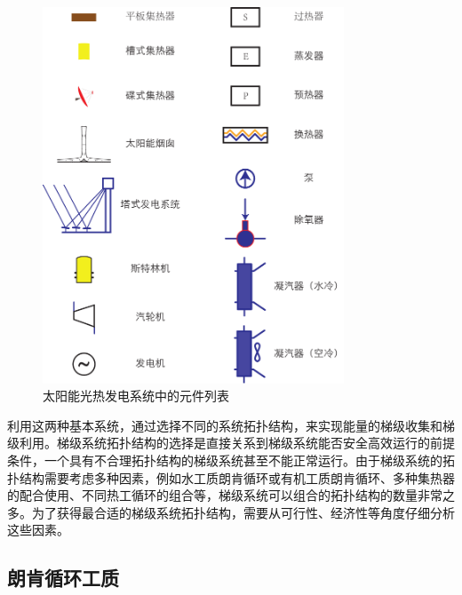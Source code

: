\begin{figure}[!ht]
\centering
\includegraphics[width=0.8\textwidth]{fig/Legends.pdf}
\caption{太阳能光热发电系统中的元件列表}
\label{fig:Legends}
\end{figure}

利用这两种基本系统，通过选择不同的系统拓扑结构，来实现能量的梯级收集和梯级利用。梯级系统拓扑结构的选择是直接关系到梯级系统能否安全高效运行的前提条件，一个具有不合理拓扑结构的梯级系统甚至不能正常运行。由于梯级系统的拓扑结构需要考虑多种因素，例如水工质朗肯循环或有机工质朗肯循环、多种集热器的配合使用、不同热工循环的组合等，梯级系统可以组合的拓扑结构的数量非常之多。为了获得最合适的梯级系统拓扑结构，需要从可行性、经济性等角度仔细分析这些因素。

\subsection{朗肯循环工质}
\label{sec:RankineCycleFluid}

